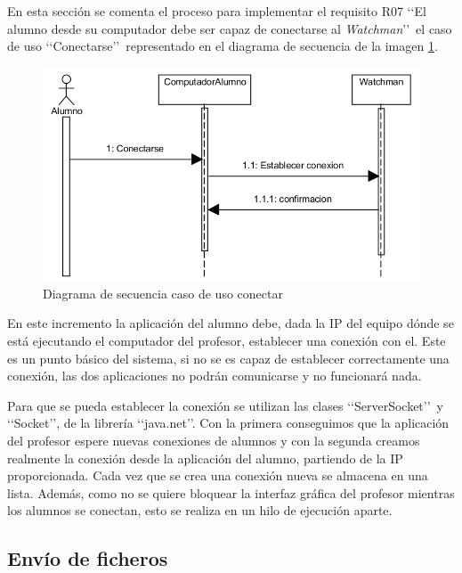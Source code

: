 En esta sección se comenta el proceso para implementar el requisito R07 \lq \lq El alumno desde su computador debe ser capaz de conectarse al \emph{Watchman}\rq \rq \ el caso de uso \lq \lq Conectarse\rq \rq \ representado en el diagrama de secuencia de la imagen \ref{fig:iteracion1:casosUso}. 
\newline

\begin{figure}
    \centering
    \includegraphics[width=.90\linewidth]{iteracion1/secConectar}
    \caption{Diagrama de secuencia caso de uso conectar}
    \label{fig:iteracion1:casosUso}
\end{figure}

En este incremento la aplicación del alumno debe, dada la IP del equipo dónde se está ejecutando el computador del profesor, establecer una conexión con el. Este es un punto básico del sistema, si no se es capaz de establecer correctamente una conexión, las dos aplicaciones no podrán comunicarse y no funcionará nada.
\newline

Para que se pueda establecer la conexión se utilizan las clases \lq \lq ServerSocket\rq \rq \  y \lq \lq Socket\rq \rq, de la librería \lq \lq java.net\rq \rq. Con la primera conseguimos que la aplicación del profesor espere nuevas conexiones de alumnos y con la segunda creamos realmente la conexión desde la aplicación del alumno, partiendo de la IP proporcionada. Cada vez que se crea una conexión nueva se almacena en una lista. Además, como no se quiere bloquear la interfaz gráfica del profesor mientras los alumnos se conectan, esto se realiza en un hilo de ejecución aparte.


\subsection{Envío de ficheros}
\label{sec:iteracion1:envio}

